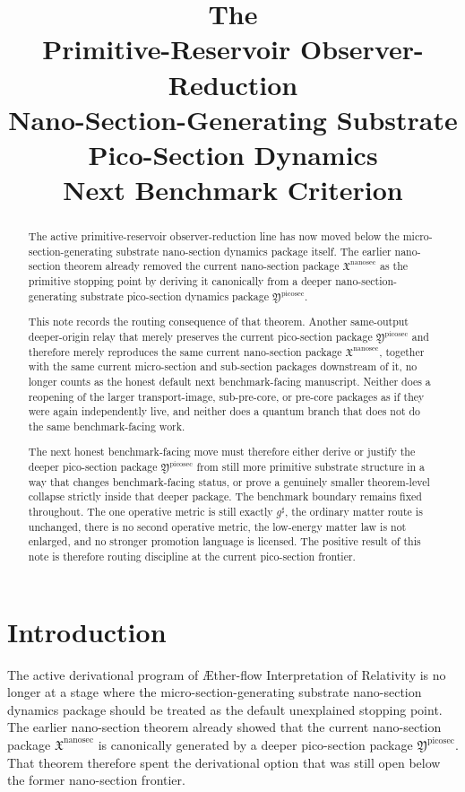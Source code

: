 \documentclass[11pt]{article}
\title{\textbf{The \TheoryName{}}\\[0.4em]
\large Primitive-Reservoir Observer-Reduction\\
\large Nano-Section-Generating Substrate Pico-Section Dynamics\\
\large Next Benchmark Criterion}
\author{}
\date{}
\newcommand{\Aflow}{\AE{}ther-flow}
\newcommand{\TheoryName}{\Aflow{} Interpretation of Relativity}
\newcommand{\CompletedMetric}{g^{\sharp}}
\newcommand{\NanoSectionPackage}{\mathfrak X^{\mathrm{nanosec}}}
\newcommand{\PicoSectionPackage}{\mathfrak Y^{\mathrm{picosec}}}
\begin{document}
\maketitle

\begin{abstract}
The active primitive-reservoir observer-reduction line has now moved below the micro-section-generating substrate nano-section dynamics package itself. The earlier nano-section theorem already removed the current nano-section package \(\NanoSectionPackage\) as the primitive stopping point by deriving it canonically from a deeper nano-section-generating substrate pico-section dynamics package \(\PicoSectionPackage\).

This note records the routing consequence of that theorem. Another same-output deeper-origin relay that merely preserves the current pico-section package \(\PicoSectionPackage\) and therefore merely reproduces the same current nano-section package \(\NanoSectionPackage\), together with the same current micro-section and sub-section packages downstream of it, no longer counts as the honest default next benchmark-facing manuscript. Neither does a reopening of the larger transport-image, sub-pre-core, or pre-core packages as if they were again independently live, and neither does a quantum branch that does not do the same benchmark-facing work.

The next honest benchmark-facing move must therefore either derive or justify the deeper pico-section package \(\PicoSectionPackage\) from still more primitive substrate structure in a way that changes benchmark-facing status, or prove a genuinely smaller theorem-level collapse strictly inside that deeper package. The benchmark boundary remains fixed throughout. The one operative metric is still exactly \(\CompletedMetric\), the ordinary matter route is unchanged, there is no second operative metric, the low-energy matter law is not enlarged, and no stronger promotion language is licensed. The positive result of this note is therefore routing discipline at the current pico-section frontier.
\end{abstract}

\section{Introduction}

The active derivational program of \TheoryName{} is no longer at a stage where the micro-section-generating substrate nano-section dynamics package should be treated as the default unexplained stopping point. The earlier nano-section theorem already showed that the current nano-section package \(\NanoSectionPackage\) is canonically generated by a deeper pico-section package \(\PicoSectionPackage\). That theorem therefore spent the derivational option that was still open below the former nano-section frontier.
\end{document}

